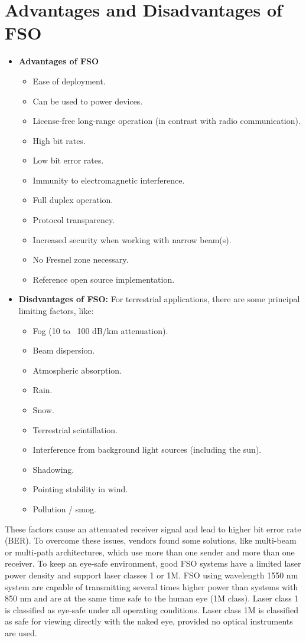 \documentclass[hidelinks, 12pt]{report}
\begin{document}
\section{Advantages and Disadvantages of FSO}
\justify
\begin{itemize}
   \item \textbf{Advantages of FSO} 
   \begin{itemize}
     \item Ease of deployment.
    \item Can be used to power devices.
    \item License-free long-range operation (in contrast with radio communication).
    \item High bit rates.
    \item Low bit error rates.
    \item Immunity to electromagnetic interference.
    \item Full duplex operation.
    \item Protocol transparency.
    \item Increased security when working with narrow beam(s).
    \item No Fresnel zone necessary.
    \item Reference open source implementation.
     \end {itemize}
      \item \textbf{Disdvantages of FSO:}
      For terrestrial applications, there are some principal limiting factors, like:
      \begin{itemize}
      \item Fog (10 to ~100 dB/km attenuation).
    \item Beam dispersion.
    \item Atmospheric absorption.
    \item Rain.
    \item Snow.
    \item Terrestrial scintillation.
    \item Interference from background light sources (including the sun).
    \item Shadowing.
    \item Pointing stability in wind.
    \item Pollution / smog.
    \end {itemize}
          \end {itemize}
These factors cause an attenuated receiver signal and lead to higher bit error rate (BER). To overcome these issues, vendors found some solutions, like multi-beam or multi-path architectures, which use more than one sender and more than one receiver. To keep an eye-safe environment, good FSO systems have a limited laser power density and support laser classes 1 or 1M. FSO using wavelength 1550 nm system are capable of transmitting several times higher power than systems with 850 nm and are at the same time safe to the human eye (1M class). 
Laser class 1 is classified as eye-safe under all operating conditions.
Laser class 1M is classified as safe for viewing directly with the naked eye, provided no optical instruments are used.
\end{document}
